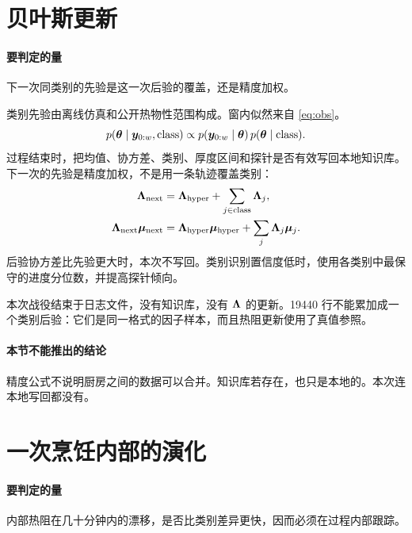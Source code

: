 \section{贝叶斯更新}

\paragraph{要判定的量}
下一次同类别的先验是这一次后验的覆盖，还是精度加权。

类别先验由离线仿真和公开热物性范围构成。窗内似然来自 \eqref{eq:obs}。
\begin{equation}
\label{eq:bayes}
p(\bm{\theta}\mid\bm{y}_{0:w},\mathrm{class})
\propto p(\bm{y}_{0:w}\mid\bm{\theta})\,p(\bm{\theta}\mid\mathrm{class}).
\end{equation}
过程结束时，把均值、协方差、类别、厚度区间和探针是否有效写回本地知识库。下一次的先验是精度加权，不是用一条轨迹覆盖类别：
\begin{equation}
\label{eq:hier}
\begin{aligned}
\bm{\Lambda}_{\mathrm{next}}&=\bm{\Lambda}_{\mathrm{hyper}}+\sum_{j\in\mathrm{class}}\bm{\Lambda}_{j},\\
\bm{\Lambda}_{\mathrm{next}}\bm{\mu}_{\mathrm{next}}
&=\bm{\Lambda}_{\mathrm{hyper}}\bm{\mu}_{\mathrm{hyper}}+\sum_{j}\bm{\Lambda}_{j}\bm{\mu}_{j}.
\end{aligned}
\end{equation}
后验协方差比先验更大时，本次不写回。类别识别置信度低时，使用各类别中最保守的进度分位数，并提高探针倾向。

本次战役结束于日志文件，没有知识库，没有 \(\bm{\Lambda}\) 的更新。19440 行不能累加成一个类别后验：它们是同一格式的因子样本，而且热阻更新使用了真值参照。

\paragraph{本节不能推出的结论}
精度公式不说明厨房之间的数据可以合并。知识库若存在，也只是本地的。本次连本地写回都没有。

\section{一次烹饪内部的演化}

\paragraph{要判定的量}
内部热阻在几十分钟内的漂移，是否比类别差异更快，因而必须在过程内部跟踪。

